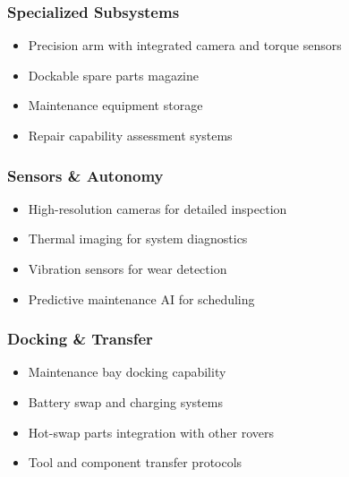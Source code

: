 \documentclass[12pt, a4paper]{article}
\begin{document}
\subsubsection{Specialized Subsystems}
\begin{itemize}
    \item Precision arm with integrated camera and torque sensors
    \item Dockable spare parts magazine
    \item Maintenance equipment storage
    \item Repair capability assessment systems
\end{itemize}

\subsubsection{Sensors \& Autonomy}
\begin{itemize}
    \item High-resolution cameras for detailed inspection
    \item Thermal imaging for system diagnostics
    \item Vibration sensors for wear detection
    \item Predictive maintenance AI for scheduling
\end{itemize}

\subsubsection{Docking \& Transfer}
\begin{itemize}
    \item Maintenance bay docking capability
    \item Battery swap and charging systems
    \item Hot-swap parts integration with other rovers
    \item Tool and component transfer protocols
\end{itemize}
\end{document}
